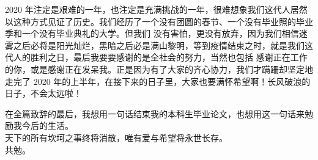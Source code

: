 2020 年注定是艰难的一年，也注定是充满挑战的一年，很难想象我们这代人居然以这种方式见证了历史。我们经历了一个没有团圆的春节、一个没有毕业照的毕业季和一个没有毕业典礼的大学。但我们
没有害怕，更没有放弃，因为我们相信迷雾之后必将是阳光灿烂，黑暗之后必是满山黎明，等到疫情结束之时，就是我们这代人的胜利之日，最后我要要感谢的是全社会的努力，当然也包括
感谢正在工作的你，或是感谢正在发呆我。正是因为有了大家的齐心协力，我们才蹒跚却坚定地走完了 2020 年的上半年，在接下来的日子里，大家也要满怀希望啊！长风破浪的日子，不会太远啦！

在全篇致辞的最后，我想用一句话结束我的本科生毕业论文，也想用这一句话来勉励我今后的生活。\\

天下的所有坎坷之事终将消散，唯有爱与希望将永世长存。\\

共勉。
